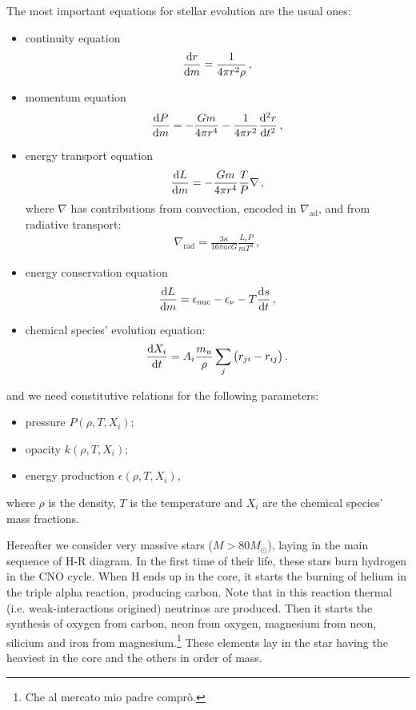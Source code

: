 \documentclass[main.tex]{subfiles}
\begin{document}
The most important equations for stellar evolution are the usual ones:
\begin{itemize}
    \item continuity equation 
    \begin{align}
    \dv{r}{m} = \frac{1}{4 \pi r^2 \rho }
    \,,
    \end{align}    
    \item momentum equation 
    \begin{align}
    \dv{P}{m} = - \frac{Gm}{4 \pi r^{4}} - \frac{1}{4 \pi r^2} \dv[2]{r}{t}
    \,,
    \end{align}
    \item energy transport equation 
    \begin{align}
    \dv{L}{m} = - \frac{Gm}{4 \pi r^4} \frac{T}{P} \nabla
    \,,
    \end{align}
    where \(\nabla\) has contributions from convection, encoded in \(\nabla _{\text{ad}} \), and from radiative transport: 
    \begin{align}
    \nabla _{\text{rad}} = \frac{3 \kappa }{16 \pi acG} \frac{L_r P}{m T^{4}}
    \,,
    \end{align}       
    \item energy conservation equation 
    \begin{align}
    \dv{L}{m} = \epsilon _{\text{nuc}}- \epsilon_{\nu } - T \dv{s}{t}
    \,,
    \end{align}
    \item chemical species' evolution equation: 
    \begin{align}
    \dv{X_{i}}{t} = A_i \frac{m_u}{\rho } \sum_{j} \qty(r_{ji} - r_{ij})
    \,.
    \end{align}
    
\end{itemize}
%
and we need constitutive relations for the following parameters:
%
\begin{itemize}
    \item pressure $P(\rho,T,X_i)$;
    \item opacity $k(\rho,T,X_i)$;
    \item energy production $\epsilon(\rho,T,X_i)$,
\end{itemize}
%
where \(\rho \) is the density, \(T\) is the temperature and \(X_i\) are the chemical species' mass fractions.

Hereafter we consider very massive stars (\(M > 80 M_{\odot}\)), laying in the main sequence of H-R diagram. In the first time of their life, these stars burn hydrogen in the CNO cycle. When H ends up in the core, it starts the burning of helium in the triple alpha reaction, producing carbon.
Note that in this reaction thermal (i.e. weak-interactions origined) neutrinos are produced.
Then it starts the synthesis of oxygen from carbon, neon from oxygen, magnesium from neon, silicium and iron from magnesium.\footnote{Che al mercato mio padre comprò.}
These elements lay in the star having the heaviest in the core and the others in order of mass. 
\end{document}
